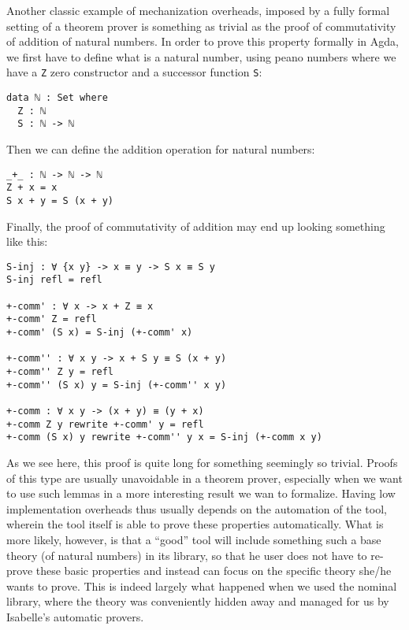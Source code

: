 \documentclass[a4paper, 12pt, twoside]{style/ociamthesis}
\theoremstyle{plain}
\theoremstyle{definition}
\newtheorem{Example}{Example}[chapter]
\theoremstyle{remark}
\renewenvironment{Example}{\begin{OldExample}\begin{mdframed}[style=example, linecolor=yellow]}{\end{mdframed}\end{OldExample}}
\begin{document}
\begin{Example}

\label{Example:commNat} Another classic example of mechanization
overheads, imposed by a fully formal setting of a theorem prover is
something as trivial as the proof of commutativity of addition of
natural numbers. In order to prove this property formally in Agda, we
first have to define what is a natural number, using peano numbers where
we have a \texttt{Z} zero constructor and a successor function
\texttt{S}:

\begin{verbatim}
data ℕ : Set where
  Z : ℕ
  S : ℕ -> ℕ
\end{verbatim}

Then we can define the addition operation for natural numbers:

\begin{verbatim}
_+_ : ℕ -> ℕ -> ℕ
Z + x = x
S x + y = S (x + y)
\end{verbatim}

Finally, the proof of commutativity of addition may end up looking
something like this:

\begin{verbatim}
S-inj : ∀ {x y} -> x ≡ y -> S x ≡ S y
S-inj refl = refl

+-comm' : ∀ x -> x + Z ≡ x
+-comm' Z = refl
+-comm' (S x) = S-inj (+-comm' x)

+-comm'' : ∀ x y -> x + S y ≡ S (x + y)
+-comm'' Z y = refl
+-comm'' (S x) y = S-inj (+-comm'' x y)

+-comm : ∀ x y -> (x + y) ≡ (y + x)
+-comm Z y rewrite +-comm' y = refl
+-comm (S x) y rewrite +-comm'' y x = S-inj (+-comm x y)
\end{verbatim}

As we see here, this proof is quite long for something seemingly so
trivial. Proofs of this type are usually unavoidable in a theorem
prover, especially when we want to use such lemmas in a more interesting
result we wan to formalize. Having low implementation overheads thus
usually depends on the automation of the tool, wherein the tool itself
is able to prove these properties automatically. What is more likely,
however, is that a ``good'' tool will include something such a base
theory (of natural numbers) in its library, so that he user does not
have to re-prove these basic properties and instead can focus on the
specific theory she/he wants to prove. This is indeed largely what
happened when we used the nominal library, where the theory was
conveniently hidden away and managed for us by Isabelle's automatic
provers.

\end{Example}
\end{document}
